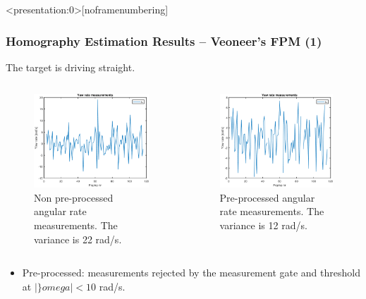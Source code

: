 \documentclass{beamer}
\begin{document}
\begin{frame}<presentation:0>[noframenumbering]
	\frametitle{Homography Estimation Results -- Veoneer's FPM (1)}
	The target is driving straight.
	\begin{columns}
	\begin{figure}
		\centering
		\includegraphics[width=\textwidth]{Veoneer/155532_AngVel_NoGate_fpm}
		\caption{Non pre-processed angular rate measurements. The variance is 22 rad/s.}
	\end{figure}
	\begin{figure}
		\centering
		\includegraphics[width=\textwidth]{Veoneer/155532_AngVelMeasurements}
		\caption{Pre-processed angular rate measurements. The variance is 12 rad/s.}
	\end{figure}
	\end{columns}

	\note
	{
		\begin{itemize}
			\item Pre-processed: measurements rejected by the measurement gate and threshold at $|\}omega|<10$ rad/s.
		\end{itemize}
	}
\end{frame}
\end{document}
